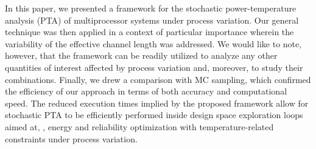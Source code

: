 In this paper, we presented a framework for the stochastic power-temperature analysis (PTA) of multiprocessor systems under process variation.
Our general technique was then applied in a context of particular importance wherein the variability of the effective channel length was addressed.
We would like to note, however, that the framework can be readily utilized to analyze any other quantities of interest affected by process variation and, moreover, to study their combinations.
Finally, we drew a comparison with MC sampling, which confirmed the efficiency of our approach in terms of both accuracy and computational speed.
The reduced execution times implied by the proposed framework allow for stochastic PTA to be efficiently performed inside design space exploration loops aimed at, \eg, energy and reliability optimization with temperature-related constraints under process variation.
